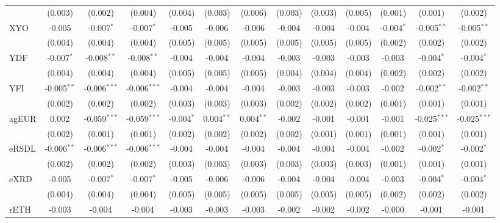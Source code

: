 \begin{table}[!htbp]
\begin{tabular}{@{\extracolsep{5pt}}lcccccccccccc}
  & (0.003) & (0.002) & (0.004) & (0.004) & (0.003) & (0.006) & (0.003) & (0.003) & (0.005) & (0.001) & (0.001) & (0.002) \\
 XYO & -0.005$^{}$ & -0.007$^{*}$ & -0.007$^{*}$ & -0.005$^{}$ & -0.006$^{}$ & -0.006$^{}$ & -0.004$^{}$ & -0.004$^{}$ & -0.004$^{}$ & -0.004$^{*}$ & -0.005$^{**}$ & -0.005$^{**}$ \\
  & (0.004) & (0.004) & (0.004) & (0.005) & (0.005) & (0.005) & (0.005) & (0.005) & (0.005) & (0.002) & (0.002) & (0.002) \\
 YDF & -0.007$^{*}$ & -0.008$^{**}$ & -0.008$^{**}$ & -0.004$^{}$ & -0.004$^{}$ & -0.004$^{}$ & -0.003$^{}$ & -0.003$^{}$ & -0.003$^{}$ & -0.003$^{}$ & -0.004$^{*}$ & -0.004$^{*}$ \\
  & (0.004) & (0.004) & (0.004) & (0.005) & (0.005) & (0.005) & (0.004) & (0.004) & (0.004) & (0.002) & (0.002) & (0.002) \\
 YFI & -0.005$^{**}$ & -0.006$^{***}$ & -0.006$^{***}$ & -0.004$^{}$ & -0.004$^{}$ & -0.004$^{}$ & -0.003$^{}$ & -0.003$^{}$ & -0.003$^{}$ & -0.002$^{}$ & -0.002$^{**}$ & -0.002$^{**}$ \\
  & (0.002) & (0.002) & (0.002) & (0.003) & (0.003) & (0.003) & (0.002) & (0.002) & (0.002) & (0.001) & (0.001) & (0.001) \\
 agEUR & 0.002$^{}$ & -0.059$^{***}$ & -0.059$^{***}$ & -0.004$^{*}$ & 0.004$^{**}$ & 0.004$^{**}$ & -0.002$^{}$ & -0.001$^{}$ & -0.001$^{}$ & -0.001$^{}$ & -0.025$^{***}$ & -0.025$^{***}$ \\
  & (0.002) & (0.001) & (0.001) & (0.002) & (0.002) & (0.002) & (0.002) & (0.001) & (0.001) & (0.001) & (0.001) & (0.001) \\
 eRSDL & -0.006$^{**}$ & -0.006$^{***}$ & -0.006$^{***}$ & -0.004$^{}$ & -0.004$^{}$ & -0.004$^{}$ & -0.004$^{}$ & -0.004$^{}$ & -0.004$^{}$ & -0.002$^{}$ & -0.002$^{*}$ & -0.002$^{*}$ \\
  & (0.002) & (0.002) & (0.002) & (0.003) & (0.003) & (0.003) & (0.003) & (0.003) & (0.003) & (0.001) & (0.001) & (0.001) \\
 eXRD & -0.005$^{}$ & -0.007$^{*}$ & -0.007$^{*}$ & -0.005$^{}$ & -0.006$^{}$ & -0.006$^{}$ & -0.004$^{}$ & -0.004$^{}$ & -0.004$^{}$ & -0.003$^{}$ & -0.004$^{*}$ & -0.004$^{*}$ \\
  & (0.004) & (0.004) & (0.004) & (0.005) & (0.005) & (0.005) & (0.005) & (0.005) & (0.005) & (0.002) & (0.002) & (0.002) \\
 rETH & -0.003$^{}$ & -0.004$^{}$ & -0.004$^{}$ & -0.003$^{}$ & -0.003$^{}$ & -0.003$^{}$ & -0.002$^{}$ & -0.002$^{}$ & -0.002$^{}$ & -0.000$^{}$ & -0.001$^{}$ & -0.001$^{}$ \\

\end{tabular}
\end{table}
